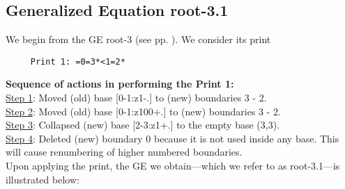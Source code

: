 \documentclass[final]{article}
\begin{document}
\subsection*{Generalized Equation root-3.1}
\label{root-3.1}We begin from the GE root-3 (see pp. \pageref{root-3}).  {We consider its print}
\begin{verbatim}
     Print 1: =0=3*<1=2*
\end{verbatim}
{\bf Sequence of actions in performing the Print 1:}\\
{\underline{Step 1}:} Moved (old) base [0-1:z1-.]  to (new) boundaries 3 - 2.\\
{\underline{Step 2}:} Moved (old) base [0-1:z100+.]  to (new) boundaries 3 - 2.\\
{\underline{Step 3}:} Collapsed (new) base [2-3:z1+.]  to the empty base (3,3).
\\
{\underline{Step 4}:} Deleted (new) boundary 0 because it is not used inside any base.  This will cause renumbering of higher numbered boundaries.
\\[0.1in]
{Upon applying the print, the GE we obtain---which we refer to as root-3.1---is illustrated below:}
\end{document}
